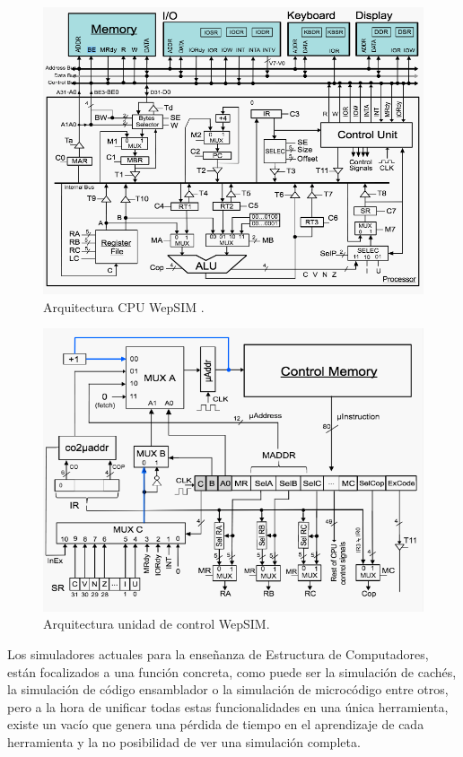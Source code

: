 \begin{figure}[htbp]
 	\centering
 	\includegraphics[width=12cm]{figures/cpu}
 	\caption{Arquitectura CPU WepSIM .}
	\label{fig:wepsimCPU_figure}
\end{figure}

\begin{figure}[htbp]
 	\centering
 	\includegraphics[width=12cm]{figures/controlUnit}
 	\caption{Arquitectura unidad de control WepSIM.}
	\label{fig:wepsimCU_figure}
\end{figure}

Los simuladores actuales para la enseñanza de Estructura de Computadores, están focalizados a una función concreta, como puede ser la simulación de cachés, la simulación de código ensamblador o la simulación de microcódigo entre otros, pero a la hora de unificar todas estas funcionalidades en una única herramienta, existe un vacío que genera una pérdida de tiempo en el aprendizaje de cada herramienta y la no posibilidad de ver una simulación completa.

